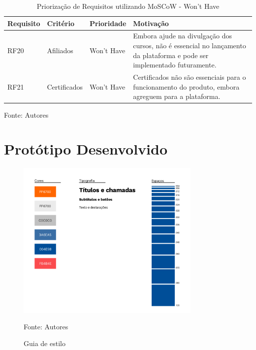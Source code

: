 \begin{apendicesenv}
\begin{table}[h]
    \centering
    \caption{Priorização de Requisitos utilizando MoSCoW - Won’t Have}
    \label{tab:priorizacao_moscow4}
    \begin{adjustbox}{width=\textwidth}
        \begin{tabular}{|p{2.5cm}|p{5cm}|p{5cm}|p{4cm}|}
            \hline
            \textbf{Requisito} & \textbf{Critério} & \textbf{Prioridade} & \textbf{Motivação} \\
            \hline
            RF20 & Afiliados & Won’t Have & Embora ajude na divulgação dos cursos, não é essencial no lançamento da plataforma e pode ser implementado futuramente. \\
            \hline
            RF21 & Certificados & Won’t Have & Certificados não são essenciais para o funcionamento do produto, embora agreguem para a plataforma. \\
            \hline
        \end{tabular}
    \end{adjustbox}

    \vspace{5mm}
    {\footnotesize Fonte: Autores} 
\end{table}


\chapter{Protótipo Desenvolvido}

    \begin{figure}[h]
        \centering
        \caption{Guia de estilo}
        \includegraphics[width=0.8\textwidth]{figuras/guia-de-estilo.png}
        \begin{center}
            {\footnotesize Fonte: Autores}
        \end{center}
        \label{fig:guia-de-estilo}
    \end{figure}


\end{apendicesenv}
